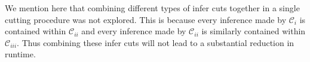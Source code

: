 We mention here that combining different 
types of infer cuts together in a single cutting procedure
was not explored.
This is because every inference made by $\mathcal{C}_{i}$ is 
contained within $\mathcal{C}_{ii}$ and every inference made by $\mathcal{C}_{ii}$
is similarly contained within $\mathcal{C}_{iii}$.
Thus combining these infer cuts will not lead to a
substantial reduction in runtime.

